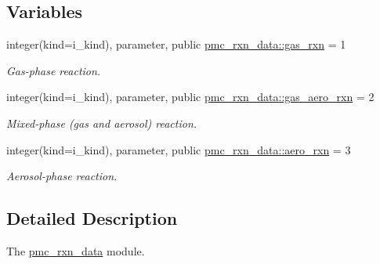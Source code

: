 \subsection*{Variables}
\begin{DoxyCompactItemize}
\item 
integer(kind=i\+\_\+kind), parameter, public \mbox{\hyperlink{namespacepmc__rxn__data_a111b121911199623f10770744af6488f}{pmc\+\_\+rxn\+\_\+data\+::gas\+\_\+rxn}} = 1
\begin{DoxyCompactList}\small\item\em Gas-\/phase reaction. \end{DoxyCompactList}\item 
integer(kind=i\+\_\+kind), parameter, public \mbox{\hyperlink{namespacepmc__rxn__data_aa70ce267bb3565e338327b106143ba5f}{pmc\+\_\+rxn\+\_\+data\+::gas\+\_\+aero\+\_\+rxn}} = 2
\begin{DoxyCompactList}\small\item\em Mixed-\/phase (gas and aerosol) reaction. \end{DoxyCompactList}\item 
integer(kind=i\+\_\+kind), parameter, public \mbox{\hyperlink{namespacepmc__rxn__data_a5f312af427a9f94444065a1fb53289ce}{pmc\+\_\+rxn\+\_\+data\+::aero\+\_\+rxn}} = 3
\begin{DoxyCompactList}\small\item\em Aerosol-\/phase reaction. \end{DoxyCompactList}\end{DoxyCompactItemize}


\subsection{Detailed Description}
The \mbox{\hyperlink{namespacepmc__rxn__data}{pmc\+\_\+rxn\+\_\+data}} module. 

